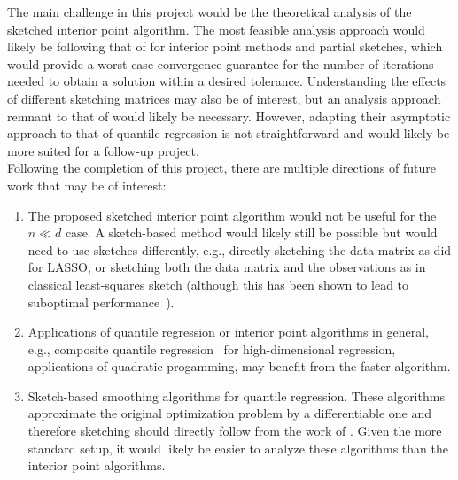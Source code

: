 The main challenge in this project would be the theoretical analysis of the sketched interior point algorithm. The most feasible analysis approach would likely be following that of \citet{Pilanci:2017} for interior point methods and partial sketches, which would provide a worst-case convergence guarantee for the number of iterations needed to obtain a solution within a desired tolerance. Understanding the effects of different sketching matrices may also be of interest, but an analysis approach remnant to that of \citet{Lacotte:2020} would likely be necessary. However, adapting their asymptotic approach to that of quantile regression is not straightforward and would likely be more suited for a follow-up project.
\\

Following the completion of this project, there are multiple directions of future work that may be of interest:
\begin{enumerate}
\item
The proposed sketched interior point algorithm would not be useful for the $n\ll d$ case. A sketch-based method would likely still be possible but would need to use sketches differently, e.g., directly sketching the data matrix as \citet{Pham:2015} did for LASSO, or sketching both the data matrix and the observations as in classical least-squares sketch (although this has been shown to lead to suboptimal performance~\citep{Pilanci:2016}).
\item
Applications of quantile regression or interior point algorithms in general, e.g., composite quantile regression~\citep{Zou:2008} for high-dimensional regression, applications of quadratic progamming, may benefit from the faster algorithm.
\item
Sketch-based smoothing algorithms for quantile regression. These algorithms approximate the original optimization problem by a differentiable one and therefore sketching should directly follow from the work of \citet{Pilanci:2017}. Given the more standard setup, it would likely be easier to analyze these algorithms than the interior point algorithms.
\end{enumerate}

\iffalse
\newpage


\subsection{Proposal 2: MY OTHER PROPOSAL TITLE} %

\fi